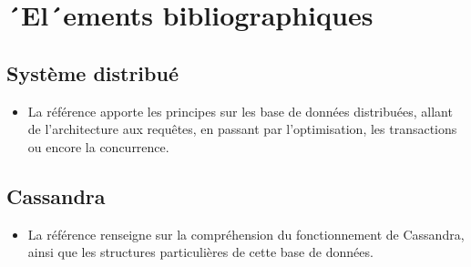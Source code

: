\documentclass[12 pt]{article}
\begin{document}
\section{´El´ements bibliographiques}
\subsection{Syst\`eme distribu\'e}
\begin{itemize}
\item La r\'ef\'erence \cite{özsu2011principles} apporte les principes sur les base de donn\'ees distribu\'ees, allant de l'architecture aux requ\^etes, en passant par l'optimisation, les transactions ou encore la concurrence.
\end{itemize}
\subsection{Cassandra}
\begin{itemize}
\item La r\'ef\'erence \cite{hewitt2010cassandra} renseigne sur la compr\'ehension du fonctionnement de Cassandra, ainsi que les structures particuli\`eres de cette base de donn\'ees.
\end{itemize}

\end{document}
